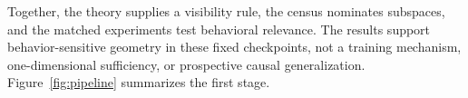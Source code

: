 Together, the theory supplies a visibility rule, the census nominates
subspaces, and the matched experiments test behavioral relevance. The results
support behavior-sensitive geometry in these fixed checkpoints, not a training
mechanism, one-dimensional sufficiency, or prospective causal generalization.
Figure~\ref{fig:pipeline} summarizes the first stage.
